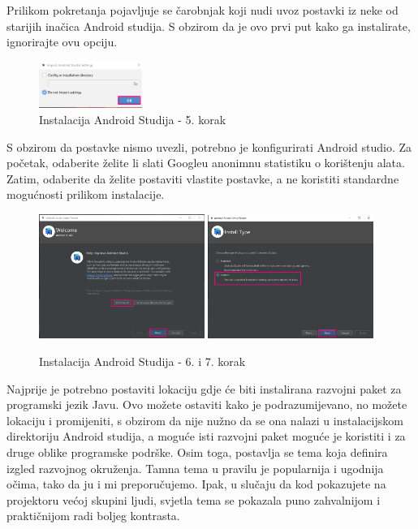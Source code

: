 \documentclass[11pt,a4paper,twoside]{article}
\begin{document}
	Prilikom pokretanja pojavljuje se čarobnjak koji nudi uvoz postavki iz neke od starijih inačica Android studija. S obzirom da je ovo prvi put kako ga instalirate, ignorirajte ovu opciju. 
	
	\begin{figure}[!h]
		\centering
		\includegraphics[width=0.3\textwidth]{install_05.png}
		\caption{Instalacija Android Studija - 5. korak}
		\label{fig:install_05}	
	\end{figure}

	S obzirom da postavke nismo uvezli, potrebno je konfigurirati Android studio. Za početak, odaberite želite li slati Googleu anonimnu statistiku o korištenju alata. 	Zatim, odaberite da želite postaviti vlastite postavke, a ne koristiti standardne mogućnosti prilikom instalacije. 	

	\begin{figure}[!h]
		\centering
		\includegraphics[width=0.48\textwidth]{install_06.png}
		\hfill
		\includegraphics[width=0.48\textwidth]{install_07.png}
		\caption{Instalacija Android Studija - 6. i 7. korak}
		\label{fig:install_06}	
	\end{figure}

	Najprije je potrebno postaviti lokaciju gdje će biti instalirana razvojni paket za programski jezik Javu. Ovo možete ostaviti kako je podrazumijevano, no možete lokaciju i promijeniti, s obzirom da nije nužno da se ona nalazi u instalacijskom direktoriju Android studija, a moguće isti razvojni paket moguće je koristiti i za druge oblike programske podrške. Osim toga, postavlja se tema koja definira izgled razvojnog okruženja. Tamna tema u pravilu je popularnija i ugodnija očima, tako da ju i mi preporučujemo. Ipak, u slučaju da kod pokazujete na projektoru većoj skupini ljudi, svjetla tema se pokazala puno zahvalnijom i praktičnijom radi boljeg kontrasta.
	
\end{document}
